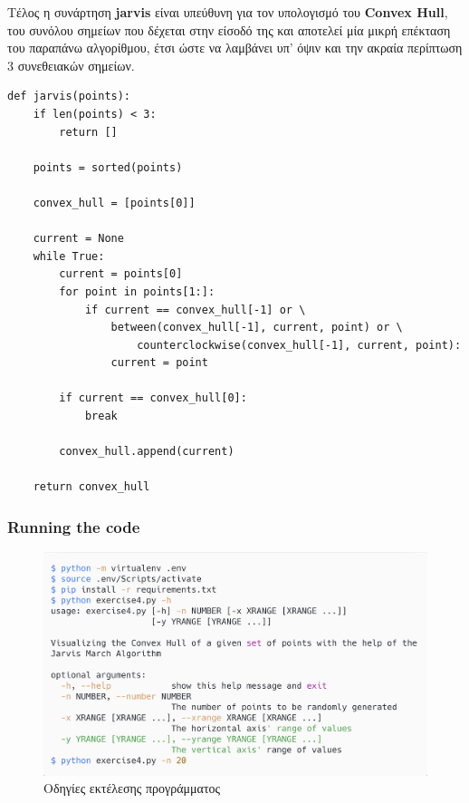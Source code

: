 \documentclass[12pt]{article}
\newenvironment{matlab}
	{\begin{figure}[H]\centering\captionsetup{justification=centering}}
	{\end{figure}}
\begin{document}
\pagebreak

Τέλος η συνάρτηση \textbf{jarvis} είναι υπεύθυνη για τον υπολογισμό
του \textbf{Convex Hull}, του συνόλου σημείων που δέχεται στην είσοδό
της και αποτελεί μία μικρή επέκταση του παραπάνω αλγορίθμου, έτσι ώστε
να λαμβάνει υπ' όψιν και την ακραία περίπτωση 3 συνεθειακών σημείων. \\

\begin{lstlisting}
def jarvis(points):
    if len(points) < 3:
        return []

    points = sorted(points)

    convex_hull = [points[0]]

    current = None
    while True:
        current = points[0]
        for point in points[1:]:
            if current == convex_hull[-1] or \
                between(convex_hull[-1], current, point) or \
                    counterclockwise(convex_hull[-1], current, point):
                current = point

        if current == convex_hull[0]:
            break

        convex_hull.append(current)

    return convex_hull
\end{lstlisting}

\pagebreak

\subsubsection*{Running the code}

\begin{matlab}
    \includegraphics[scale=0.140]{images/gift_wrapping_algorithm.png}
    \caption{Οδηγίες εκτέλεσης προγράμματος}
\end{matlab}
\end{document}
